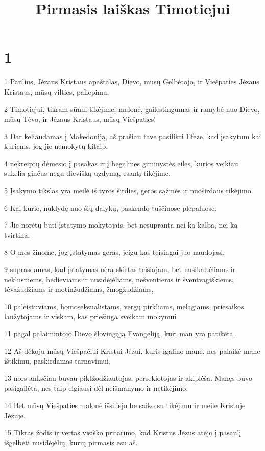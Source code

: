 

\title{Pirmasis laiškas Timotiejui}

\chapter{1}


\par 1 Paulius, Jėzaus Kristaus apaštalas, Dievo, mūsų Gelbėtojo, ir Viešpaties Jėzaus Kristaus, mūsų vilties, paliepimu,­ 
\par 2 Timotiejui, tikram sūnui tikėjime: malonė, gailestingumas ir ramybė nuo Dievo, mūsų Tėvo, ir Jėzaus Kristaus, mūsų Viešpaties! 
\par 3 Dar keliaudamas į Makedoniją, aš prašiau tave pasilikti Efeze, kad įsakytum kai kuriems, jog jie nemokytų kitaip, 
\par 4 nekreiptų dėmesio į pasakas ir į begalines giminystės eiles, kurios veikiau sukelia ginčus negu dievišką ugdymą, esantį tikėjime. 
\par 5 Įsakymo tikslas yra meilė iš tyros širdies, geros sąžinės ir nuoširdaus tikėjimo. 
\par 6 Kai kurie, nuklydę nuo šių dalykų, paskendo tuščiuose plepaluose. 
\par 7 Jie norėtų būti įstatymo mokytojais, bet nesupranta nei ką kalba, nei ką tvirtina. 
\par 8 O mes žinome, jog įstatymas geras, jeigu kas teisingai juo naudojasi, 
\par 9 suprasdamas, kad įstatymas nėra skirtas teisiajam, bet nusikaltėliams ir neklusniems, bedieviams ir nusidėjėliams, nešventiems ir šventvagiškiems, tėvažudžiams ir motinžudžiams, žmogžudžiams, 
\par 10 paleistuviams, homoseksualistams, vergų pirkliams, melagiams, priesaikos laužytojams ir viskam, kas priešinga sveikam mokymui 
\par 11 pagal palaimintojo Dievo šlovingąją Evangeliją, kuri man yra patikėta. 
\par 12 Aš dėkoju mūsų Viešpačiui Kristui Jėzui, kuris įgalino mane, nes palaikė mane ištikimu, paskirdamas tarnavimui, 
\par 13 nors anksčiau buvau piktžodžiautojas, persekiotojas ir akiplėša. Manęs buvo pasigailėta, nes taip elgiausi dėl neišmanymo ir netikėjimo. 
\par 14 Bet mūsų Viešpaties malonė išsiliejo be saiko su tikėjimu ir meile Kristuje Jėzuje. 
\par 15 Tikras žodis ir vertas visiško pritarimo, kad Kristus Jėzus atėjo į pasaulį išgelbėti nusidėjėlių, kurių pirmasis esu aš. 
